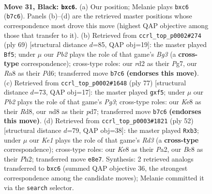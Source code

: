 \documentclass[11pt]{article}
\begin{document}
\clearpage

\begin{figure}[p]\centering
\begin{subfigure}{0.46\textwidth}\centering
\resizebox{\linewidth}{!}{%
\newchessgame
\chessboard[
  setfen={r1bNkbn1/ppp5/2P1p3/P7/1n3P2/8/3R4/RNB1K3 b Q - 0 31},
  showmover=false,
  pgfstyle=straightmove, color=movearrow, markmove={b7-c6}
]}
\caption{}
\end{subfigure}\hfill
\begin{subfigure}{0.46\textwidth}\centering
\resizebox{\linewidth}{!}{%
\newchessgame
\chessboard[
  setfen={8/6pk/2ppr1b1/p3p2n/2P4P/3N1P2/P7/K2R2R1 b - - 3 35},
  showmover=false,
  pgfstyle=straightmove, color=movearrow, markmove={g6-f5}
]}
\caption{}
\end{subfigure}
\\[4pt]
\begin{subfigure}{0.46\textwidth}\centering
\resizebox{\linewidth}{!}{%
\newchessgame
\chessboard[
  setfen={3r2k1/3Pr2p/5bp1/4pP2/2N1n3/5N2/1P5P/4RR1K b - - 0 39},
  showmover=false,
  pgfstyle=straightmove, color=movearrow, markmove={g6-f5}
]}
\caption{}
\end{subfigure}\hfill
\begin{subfigure}{0.46\textwidth}\centering
\resizebox{\linewidth}{!}{%
\newchessgame
\chessboard[
  setfen={2r4r/2N1Pk1p/pp1B2p1/8/6b1/1n1R4/P5PP/6K1 w - - 2 27},
  showmover=false,
  pgfstyle=straightmove, color=movearrow, markmove={d3-b3}
]}
\caption{}
\end{subfigure}
\caption{\textbf{Move 31, Black: \texttt{bxc6}.} (a) Our position; Melanie plays \texttt{bxc6} (\texttt{b7c6}). Panels (b)--(d) are the retrieved master positions whose correspondence most drove this move (highest QAP objective among those that transfer to it). (b) Retrieved from \texttt{ccrl\_top\_p0002\#274} (ply 69) [structural distance $d$=85, QAP obj=19]: the master played \texttt{Bf5}; under $\mu$ our \emph{Pb2} plays the role of that game's \emph{Bg3} (a \textbf{cross-type} correspondence); cross-type roles: our \emph{r}d2 as their \emph{P}g7, our \emph{R}a8 as their \emph{P}d6; transferred move \texttt{b7c6} \textbf{(endorses this move)}. (c) Retrieved from \texttt{ccrl\_top\_p0002\#1648} (ply 77) [structural distance $d$=73, QAP obj=17]: the master played \texttt{gxf5}; under $\mu$ our \emph{Pb2} plays the role of that game's \emph{Pg3}; cross-type roles: our \emph{K}e8 as their \emph{R}d8, our \emph{n}d8 as their \emph{p}d7; transferred move \texttt{b7c6} \textbf{(endorses this move)}. (d) Retrieved from \texttt{ccrl\_top\_p0003\#1821} (ply 52) [structural distance $d$=79, QAP obj=38]: the master played \texttt{Rxb3}; under $\mu$ our \emph{Ke1} plays the role of that game's \emph{Rd3} (a \textbf{cross-type} correspondence); cross-type roles: our \emph{K}e8 as their \emph{P}a2, our \emph{B}c8 as their \emph{P}h2; transferred move \texttt{e8e7}. Synthesis: 2 retrieved analogs transferred to \texttt{bxc6} (summed QAP objective 36, the strongest correspondence among the candidate moves); Melanie committed it via the \texttt{search} selector.}
\label{fig:thought-m61}
\end{figure}
\end{document}
